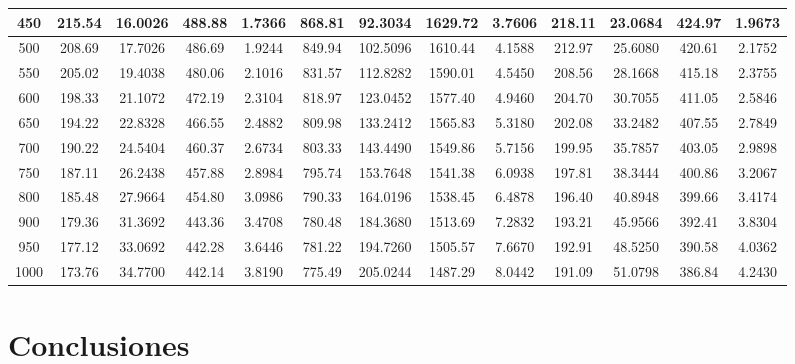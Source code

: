 \documentclass[12pt]{article}
\begin{document}
\begin{table}[ht]
{\begin{tabular}{ |c |c | c | c | c | c | c | c | c | c | c | c | c | }
      450
      & 215.54 & 16.0026 & 488.88 & 1.7366
      & 868.81 & 92.3034 & 1629.72 & 3.7606
      & 218.11 & 23.0684 & 424.97 & 1.9673 \\ \hline
      500
      & 208.69 & 17.7026 & 486.69 & 1.9244
      & 849.94 & 102.5096 & 1610.44 & 4.1588
      & 212.97 & 25.6080 & 420.61 & 2.1752 \\ \hline
      550
      & 205.02 & 19.4038 & 480.06 & 2.1016
      & 831.57 & 112.8282 & 1590.01 & 4.5450
      & 208.56 & 28.1668 & 415.18 & 2.3755 \\ \hline
      600
      & 198.33 & 21.1072 & 472.19 & 2.3104
      & 818.97 & 123.0452 & 1577.40 & 4.9460
      & 204.70 & 30.7055 & 411.05 & 2.5846 \\ \hline
      650
      & 194.22 & 22.8328 & 466.55 & 2.4882
      & 809.98 & 133.2412 & 1565.83 & 5.3180
      & 202.08 & 33.2482 & 407.55 & 2.7849 \\ \hline
      700
      & 190.22 & 24.5404 & 460.37 & 2.6734
      & 803.33 & 143.4490 & 1549.86 & 5.7156
      & 199.95 & 35.7857 & 403.05 & 2.9898 \\ \hline
      750
      & 187.11 & 26.2438 & 457.88 & 2.8984
      & 795.74 & 153.7648 & 1541.38 & 6.0938
      & 197.81 & 38.3444 & 400.86 & 3.2067 \\ \hline
      800
      & 185.48 & 27.9664 & 454.80 & 3.0986
      & 790.33 & 164.0196 & 1538.45 & 6.4878
      & 196.40 & 40.8948 & 399.66 & 3.4174 \\ \hline
      900
      & 179.36 & 31.3692 & 443.36 & 3.4708
      & 780.48 & 184.3680 & 1513.69 & 7.2832
      & 193.21 & 45.9566 & 392.41 & 3.8304 \\ \hline
      950
      & 177.12 & 33.0692 & 442.28 & 3.6446
      & 781.22 & 194.7260 & 1505.57 & 7.6670
      & 192.91 & 48.5250 & 390.58 & 4.0362 \\ \hline
      1000
      & 173.76 & 34.7700 & 442.14 & 3.8190
      & 775.49 & 205.0244 & 1487.29 & 8.0442
      & 191.09 & 51.0798 & 386.84 & 4.2430 \\ \hline
    \end{tabular}
  }
\end{table}
\newpage
\section{Conclusiones}
\end{document}
